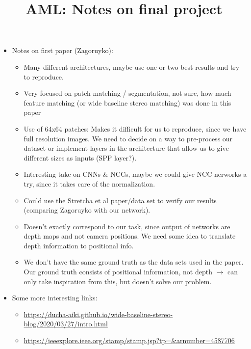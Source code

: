\documentclass{article}
\begin{document}
\title{\textbf{AML: Notes on final project}}

\maketitle
\large

\begin{itemize}
\item Notes on first paper (Zagoruyko):

\begin{itemize}
\item Many different architectures, maybe use one or two best results and try to reproduce.
\item Very focused on patch matching / segmentation, not sure, how much feature matching (or wide baseline stereo matching) was done in this paper
\item Use of 64x64 patches: Makes it difficult for us to reproduce, since we have full resolution images. We need to decide on a way to pre-process our dataset or implement layers in the architecture that allow us to give different sizes as inputs (SPP layer?).
\item Interesting take on CNNs \& NCCs, maybe we could give NCC nerworks a try, since it takes care of the normalization.
\item Could use the Stretcha et al paper/data set to verify our results (comparing Zagoruyko with our network).
\item Doesn't exactly correspond to our task, since output of networks are depth maps and not camera positions. We need some idea to translate depth information to positional info.
\item We don't have the same ground truth as the data sets used in the paper. Our ground truth consists of positional information, not depth $\rightarrow$ can only take inspiration from this, but doesn't solve our problem.
\end{itemize}

\item Some more interesting links:
\begin{itemize}
\item \url{https://ducha-aiki.github.io/wide-baseline-stereo-blog/2020/03/27/intro.html}
\item \url{https://ieeexplore.ieee.org/stamp/stamp.jsp?tp=&arnumber=4587706}



\end{itemize}

\end{itemize}
\end{document}
